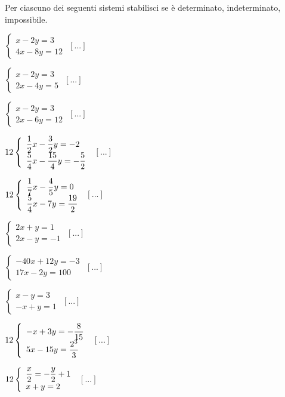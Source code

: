 \begin{esercizio}
 \label{ese:22.31}
Per ciascuno dei seguenti sistemi stabilisci se è determinato,
indeterminato, impossibile.
\begin{htmulticols}{2}
\begin{enumeratea}
\item \(\left\{\begin{array}{l}x-2y=3 \\4x-8y=12\end{array}\right.\)
 \hfill \(\left[...\right]\)
\item \(\left\{\begin{array}{l}x-2y=3 \\2x-4y=5\end{array}\right.\)
 \hfill \(\left[...\right]\)
\item \(\left\{\begin{array}{l}x-2y=3 \\2x-6y=12\end{array}\right.\)
 \hfill \(\left[...\right]\)
\item \(\arraystretch{2}\left\{\begin{array}{l}
\dfrac{1}{2}x-\dfrac{3}{2}y=-2\\
\dfrac{5}{4}x-\dfrac{15}{4}y=-{\dfrac{5}{2}}\end{array}\right.\)
 \hfill \(\left[...\right]\)
\item \(\arraystretch{2}\left\{\begin{array}{l}
\dfrac{1}{7}x-\dfrac{4}{5}y=0\\
\dfrac{5}{4}x-7y=\dfrac{19}{2}\end{array}\right.\)
 \hfill \(\left[...\right]\)
\item \(\left\{\begin{array}{l}2x+y=1 \\2x-y=-1\end{array}\right.\)
 \hfill \(\left[...\right]\)
\item \(\left\{\begin{array}{l}-40x+12y=-3\\17x-2y=100\end{array}\right.\)
 \hfill \(\left[...\right]\)
\item \(\left\{\begin{array}{l}x-y=3 \\-x+y=1 \end{array}\right.\)
 \hfill \(\left[...\right]\)
\item \(\arraystretch{2}\left\{\begin{array}{l}
-x+3y=-{\dfrac{8}{15}}\\
5x-15y=\dfrac{2^{3}}{3}\end{array}\right.\)
 \hfill \(\left[...\right]\)
\item \(\arraystretch{2}\left\{\begin{array}{l}
\dfrac{x}{2}=-{\dfrac{y}{2}}+1\\
x+y=2\end{array}\right.\)
 \hfill \(\left[...\right]\)
\end{enumeratea}
\end{htmulticols}
\end{esercizio}

